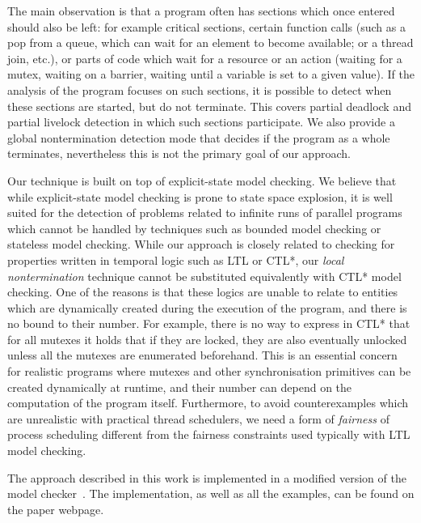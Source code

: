 The main observation is that a program often has sections which once entered
should also be left: for example critical sections, certain function calls (such
as a pop from a queue, which can wait for an element to become available; or a
thread join, etc.), or parts of code which wait for a resource or an action (waiting for a mutex, waiting on a barrier, waiting until a variable is set to a given value).
If the analysis of the program focuses on such sections, it is possible to
detect when these sections are started, but do not terminate.
This covers partial deadlock and partial livelock detection in which such sections participate.
We also provide a global nontermination detection mode that decides if the
program as a whole terminates, nevertheless this is not the primary goal of our approach.

Our technique is built on top of explicit-state model checking.  We believe that while explicit-state model checking is prone to state space explosion, it is well suited for the detection of problems related to infinite runs of parallel programs which cannot be handled by techniques such as bounded model checking or stateless model checking.
While our approach is closely related to checking for properties written in temporal logic such as LTL or CTL*, our \emph{local nontermination} technique cannot be substituted equivalently with CTL* model checking.
One of the reasons is that these logics are unable to relate to entities which are dynamically created during the execution of the program, and there is no bound to their number.
For example, there is no way to express in CTL* that for all mutexes it holds that if they are locked, they are also eventually unlocked unless all the mutexes are enumerated beforehand.
This is an essential concern for realistic programs where mutexes and other synchronisation primitives can be created dynamically at runtime, and their number can depend on the computation of the program itself.
Furthermore, to avoid counterexamples which are unrealistic with practical
thread schedulers, we need a form of \emph{fairness} of process scheduling
different from the fairness constraints used typically with LTL model checking.


The approach described in this work is implemented in a modified version of the \divine model checker~.
The implementation, as well as all the examples, can be found on the paper webpage.


